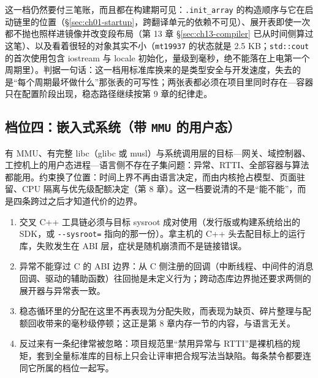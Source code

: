 \documentclass[12pt,a4paper,fontset=fandol]{ctexbook}
\newcommand{\Tp}[1]{\texttt{#1}}
\newcommand{\Opt}[1]{\texttt{-\/-#1}}
\newcommand{\Lang}[1]{\textsf{#1}}
\newcommand{\CL}{\Lang{C}}
\newcommand{\CPP}{\Lang{C++}}
\begin{document}
这一档仍然要付三笔账，而且都在构建期可见：\Tp{.init\_array} 的构造顺序与它在启动链里的位置（\S\ref{sec:ch01-startup}，跨翻译单元的依赖不可见）、展开表即使一次都不抛也照样进镜像并改变段布局（第 13 章 \S\ref{sec:ch13-compiler} 已从时间侧算过这笔）、以及看着很轻的对象其实不小（\Tp{mt19937} 的状态就是 2.5 KB；\Tp{std::cout} 的首次使用包含 iostream 与 locale 初始化，量级到毫秒，绝不能落在上电第一个周期里）。判据一句话：这一档用标准库换来的是类型安全与开发速度，失去的是``每个周期最坏做什么''那张表的可写性；两张表都必须在项目里同时存在---容器只在配置阶段出现，稳态路径继续按第 9 章的纪律走。

\subsection{档位四：嵌入式系统（带 \Tp{MMU} 的用户态）}

有 MMU、有完整 libc（glibc 或 musl）与系统调用层的目标---网关、域控制器、工控机上的用户态进程---语言侧不存在子集问题：异常、RTTI、全部容器与算法都能用。约束换了位置：时间上界不再由语言决定，而由内核抢占模型、页面驻留、CPU 隔离与优先级配额决定（第 8 章）。这一档要说清的不是``能不能''，而是四条跨过之后才知道代价的边界。

\begin{enumerate}
\item 交叉 \CPP{} 工具链必须与目标 sysroot 成对使用（发行版或构建系统给出的 SDK，或 \Opt{sysroot=} 指向的那一份）。拿主机的 \CPP{} 头去配目标上的运行库，失败发生在 ABI 层，症状是随机崩溃而不是链接错误。
\item 异常不能穿过 \CL{} 的 ABI 边界：从 C 侧注册的回调（中断线程、中间件的消息回调、驱动的辅助函数）往回抛是未定义行为；跨动态库边界抛还要求两侧的展开器与异常表一致。
\item 稳态循环里的分配在这里不再表现为分配失败，而表现为缺页、碎片整理与配额回收带来的毫秒级停顿；这正是第 8 章内存一节的内容，与语言无关。
\item 反过来有一条纪律常被忽略：项目规范里``禁用异常与 RTTI''是裸机档的规矩，套到全量标准库的目标上只会让评审把合规写法当缺陷。每条禁令都要连同它所属的档位一起写。
\end{enumerate}
\end{document}
